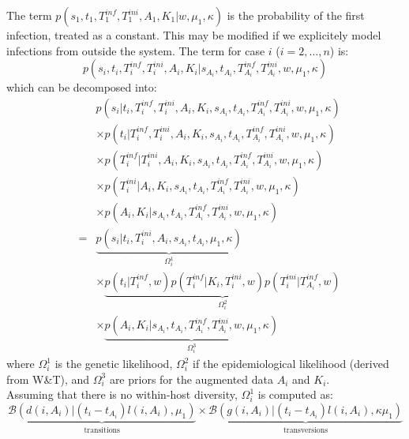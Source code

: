 \documentclass[10pt]{article}
\begin{document}
The term $p(s_1, t_1, T_1^{inf}, T_1^{ini}, A_1, K_1 | w, \mu_1, \kappa)$ is the probability of the first infection, treated as a constant.
This may be modified if we explicitely model infections from outside the system.
The term for case $i$ ($i=2,\ldots,n$) is:
\begin{equation}
 p(s_i, t_i, T_i^{inf},T_i^{ini}, A_i, K_i| s_{A_i}, t_{A_i}, T_{A_i}^{inf}, T_{A_i}^{ini}, w, \mu_1, \kappa )
\end{equation}
which can be decomposed into:
\begin{eqnarray}
& & p(s_i | t_i, T_i^{inf}, T_i^{ini}, A_i, K_i, s_{A_i}, t_{A_i}, T_{A_i}^{inf}, T_{A_i}^{ini}, w, \mu_1, \kappa) \nonumber \\
& &  \times  p(t_i | T_i^{inf}, T_i^{ini}, A_i, K_i, s_{A_i}, t_{A_i}, T_{A_i}^{inf}, T_{A_i}^{ini}, w, \mu_1, \kappa) \nonumber \\
& & \times  p(T_i^{inf}| T_i^{ini}, A_i, K_i, s_{A_i}, t_{A_i}, T_{A_i}^{inf}, T_{A_i}^{ini}, w, \mu_1, \kappa) \nonumber \\
& & \times  p(T_i^{ini}| A_i, K_i, s_{A_i}, t_{A_i}, T_{A_i}^{inf}, T_{A_i}^{ini}, w, \mu_1, \kappa) \nonumber \\
& & \times  p(A_i, K_i| s_{A_i}, t_{A_i}, T_{A_i}^{inf}, T_{A_i}^{ini}, w, \mu_1, \kappa)  \\
& = & 
\underbrace{p(s_i | t_i, T_i^{ini}, A_i, s_{A_i}, t_{A_i}, \mu_1, \kappa)}_{\Omega_i^1} \nonumber \\
& &  \times  \underbrace{p(t_i | T_i^{inf}, w) 
 p(T_i^{inf}| K_i, T_i^{ini}, w)
 p(T_i^{ini}| T_{A_i}^{inf}, w)}_{\Omega_i^2} \nonumber \\
& & \times  \underbrace{p(A_i, K_i| s_{A_i}, t_{A_i}, T_{A_i}^{inf}, T_{A_i}^{ini}, w, \mu_1, \kappa)}_{\Omega_i^3}
\end{eqnarray}
\noindent where $\Omega_i^1$ is the genetic likelihood, $\Omega_i^2$ if the epidemiological likelihood (derived from W\&T), and $\Omega_i^3$ are priors for the augmented data $A_i$ and $K_i$.
\\




Assuming that there is no within-host diversity, $\Omega_i^1$ is computed as: 
\begin{equation}
\underbrace{\mathcal{B}\left(d(i,A_i) | (t_i - t_{A_i}) l(i,A_i), \mu_1 \right)}_{\mbox{transitions}}
\times 
\underbrace{\mathcal{B}\left(g(i,A_i) | (t_i - t_{A_i}) l(i,A_i), \kappa \mu_1 \right)}_{\mbox{transversions}}
\end{equation}
\end{document}
